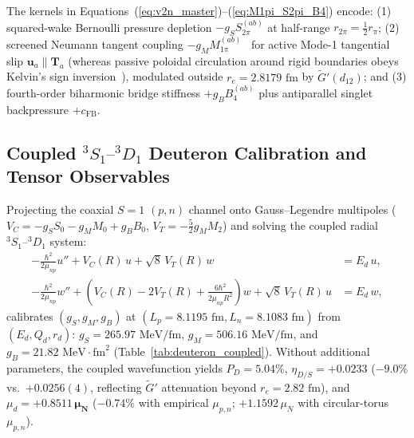 \documentclass[11pt, a4paper]{article}
\begin{document}
The kernels in Equations~(\ref{eq:v2n_master})--(\ref{eq:M1pi_S2pi_B4}) encode: (1) squared-wake Bernoulli pressure depletion $-g_S S_{2\pi}^{(ab)}$ at half-range $r_{2\pi} = \frac{1}{2}r_\pi$; (2) screened Neumann tangent coupling $-g_M M_{1\pi}^{(ab)}$~\cite{neumann1845} for active Mode-1 tangential slip $\mathbf{u}_a \parallel \mathbf{T}_a$ (whereas passive poloidal circulation around rigid boundaries obeys Kelvin's sign inversion~\cite{kelvin1848}), modulated outside $r_e = 2.8179\text{ fm}$ by $\widetilde{G}'(d_{12})$; and (3) fourth-order biharmonic bridge stiffness $+g_B B_4^{(ab)}$ plus antiparallel singlet backpressure $+c_{\mathrm{FB}}$.

\subsection{\texorpdfstring{Coupled $^3S_1\text{--}{}^3D_1$ Deuteron Calibration and Tensor Observables}{Coupled 3S1-3D1 Deuteron Calibration and Tensor Observables}}
Projecting the coaxial $S = 1$ $(p, n)$ channel onto Gauss--Legendre multipoles ($V_C = -g_S S_0 - g_M M_0 + g_B B_0$, $V_T = -\frac{5}{2}g_M M_2$) and solving the coupled radial $^3S_1\text{--}{}^3D_1$ system:
\begin{align}
    -\frac{\hbar^2}{2\mu_{np}}u'' + V_C(R)\,u + \sqrt{8}\,V_T(R)\,w &= E_d\,u, \nonumber\\
    -\frac{\hbar^2}{2\mu_{np}}w'' + \left(V_C(R) - 2V_T(R) + \frac{6\hbar^2}{2\mu_{np}R^2}\right)w + \sqrt{8}\,V_T(R)\,u &= E_d\,w,
    \label{eq:coupled_3S1_3D1}
\end{align}
calibrates $(g_S, g_M, g_B)$ at $(L_p = 8.1195\text{ fm}, L_n = 8.1083\text{ fm})$ from $(E_d, Q_d, r_d)$: $g_S = 265.97\text{ MeV/fm}$, $g_M = 506.16\text{ MeV/fm}$, and $g_B = 21.82\text{ MeV}\cdot\text{fm}^2$ (Table~\ref{tab:deuteron_coupled}). Without additional parameters, the coupled wavefunction yields $P_D = \mathbf{5.04\%}$, $\eta_{D/S} = \mathbf{+0.0233}$ ($-9.0\%$ vs.\ $+0.0256(4)$, reflecting $\widetilde{G}'$ attenuation beyond $r_e = 2.82\text{ fm}$), and $\mu_d = \mathbf{+0.8511\,\mu_N}$ ($-0.74\%$ with empirical $\mu_{p,n}$; $+1.1592\,\mu_N$ with circular-torus $\mu_{p,n}$).
\end{document}
